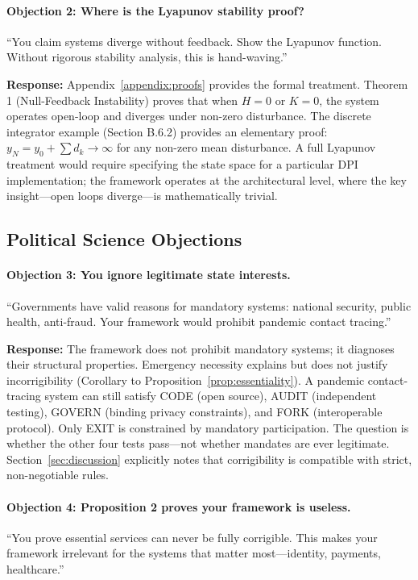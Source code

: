 \paragraph{Objection 2: Where is the Lyapunov stability proof?}
``You claim systems diverge without feedback. Show the Lyapunov function. Without rigorous stability analysis, this is hand-waving.''

\textbf{Response:} Appendix~\ref{appendix:proofs} provides the formal treatment. Theorem 1 (Null-Feedback Instability) proves that when $H=0$ or $K=0$, the system operates open-loop and diverges under non-zero disturbance. The discrete integrator example (Section B.6.2) provides an elementary proof: $y_N = y_0 + \sum d_k \to \infty$ for any non-zero mean disturbance. A full Lyapunov treatment would require specifying the state space for a particular DPI implementation; the framework operates at the architectural level, where the key insight---open loops diverge---is mathematically trivial.

\subsection{Political Science Objections}

\paragraph{Objection 3: You ignore legitimate state interests.}
``Governments have valid reasons for mandatory systems: national security, public health, anti-fraud. Your framework would prohibit pandemic contact tracing.''

\textbf{Response:} The framework does not prohibit mandatory systems; it diagnoses their structural properties. Emergency necessity explains but does not justify incorrigibility (Corollary to Proposition~\ref{prop:essentiality}). A pandemic contact-tracing system can still satisfy CODE (open source), AUDIT (independent testing), GOVERN (binding privacy constraints), and FORK (interoperable protocol). Only EXIT is constrained by mandatory participation. The question is whether the other four tests pass---not whether mandates are ever legitimate. Section~\ref{sec:discussion} explicitly notes that corrigibility is compatible with strict, non-negotiable rules.

\paragraph{Objection 4: Proposition 2 proves your framework is useless.}
``You prove essential services can never be fully corrigible. This makes your framework irrelevant for the systems that matter most---identity, payments, healthcare.''

